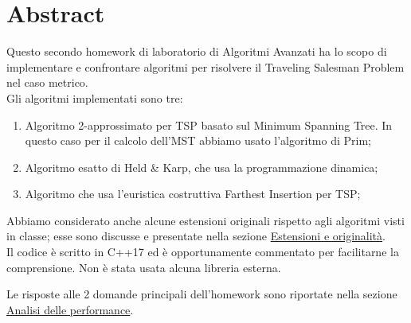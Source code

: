 \section{Abstract}
\label{cap:abstract}

Questo secondo homework di laboratorio di Algoritmi Avanzati ha lo scopo di implementare e confrontare algoritmi per risolvere il Traveling Salesman Problem nel caso metrico. \\

\noindent Gli algoritmi implementati sono tre:

\begin{enumerate}
    \item Algoritmo 2-approssimato per TSP basato sul Minimum Spanning Tree. In questo caso per il calcolo dell'MST abbiamo usato l'algoritmo di Prim;
    \item Algoritmo esatto di Held \& Karp, che usa la programmazione dinamica;
    \item Algoritmo che usa l'euristica costruttiva Farthest Insertion per TSP;
\end{enumerate}

\noindent Abbiamo considerato anche alcune estensioni originali rispetto agli algoritmi visti in classe; esse sono discusse e presentate nella sezione \hyperref[cap:extensions-and-originalities]{Estensioni e originalità}. \\

\noindent Il codice è scritto in C++17 ed è opportunamente commentato per facilitarne la comprensione. Non è stata usata alcuna libreria esterna.

\noindent Le risposte alle 2 domande principali dell'homework sono riportate nella sezione \hyperref[cap:performance-analysis]{Analisi delle performance}.

